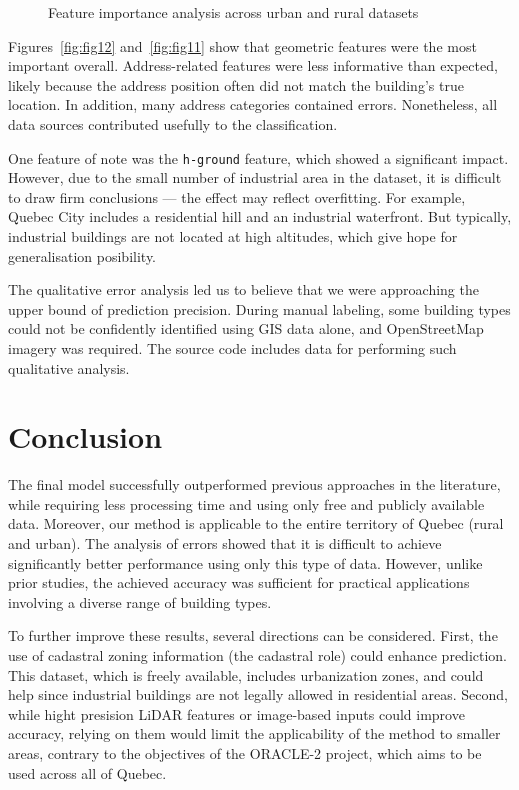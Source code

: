 \documentclass[11pt]{article}
\begin{document}
\begin{figure}[H]
\caption{Feature importance analysis across urban and rural datasets}
\label{fig:feature-importance}
\end{figure}



Figures~\ref{fig:fig12} and~\ref{fig:fig11} show that geometric features were the most important overall. Address-related features were less informative than expected, likely because the address position often did not match the building's true location. In addition, many address categories contained errors. Nonetheless, all data sources contributed usefully to the classification.  

One feature of note was the \texttt{h-ground} feature, which showed a significant impact. However, due to the small number of industrial area in the dataset, it is difficult to draw firm conclusions — the effect may reflect overfitting. For example, Quebec City includes a residential hill and an industrial waterfront. But typically, industrial buildings are not located at high altitudes, which give hope for generalisation posibility.

The qualitative error analysis led us to believe that we were approaching the upper bound of prediction precision. During manual labeling, some building types could not be confidently identified using GIS data alone, and OpenStreetMap imagery was required. The source code includes data for performing such qualitative analysis.

\section{Conclusion}

The final model successfully outperformed previous approaches in the literature, while requiring less processing time and using only free and publicly available data. Moreover, our method is applicable to the entire territory of Quebec (rural and urban). The analysis of errors showed that it is difficult to achieve significantly better performance using only this type of data. However, unlike prior studies, the achieved accuracy was sufficient for practical applications involving a diverse range of building types.

To further improve these results, several directions can be considered. First, the use of cadastral zoning information (the cadastral role) could enhance prediction. This dataset, which is freely available, includes urbanization zones, and could help since industrial buildings are not legally allowed in residential areas. Second, while hight presision LiDAR features or image-based inputs could improve accuracy, relying on them would limit the applicability of the method to smaller areas, contrary to the objectives of the ORACLE-2 project, which aims to be used across all of Quebec.
\end{document}
